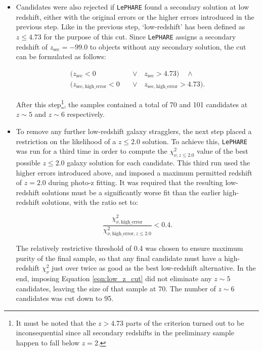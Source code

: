 \begin{itemize}
\item{} Candidates were also rejected if \texttt{LePHARE} found a secondary solution at low redshift, either with the original errors or the higher errors introduced in the previous step. Like in the previous step, `low-redshift' has been defined as $z\leq4.73$ for the purpose of this cut. Since \texttt{LePHARE} assigns a secondary redshift of $z_{\mathrm{sec}}=-99.0$ to objects without any secondary solution, the cut can be formulated as follows: 

\begin{equation}
\begin{alignedat}{1}
    (z_{\mathrm{sec}}< 0 \quad &\lor \quad z_{\mathrm{sec}}>4.73) \quad \land \quad \\ (z_{\mathrm{sec, high\_error}}< 0 \quad &\lor \quad z_{\mathrm{sec, high\_error}}>4.73).\label{eqn:z_sec_cut}
\end{alignedat}
\end{equation} 

\noindent After this step\footnote{It must be noted that the $z>4.73$ parts of the criterion turned out to be inconsequential since all secondary redshifts in the preliminary sample happen to fall below $z=2$.}, the samples contained a total of 70 and 101 candidates at $z\sim5$ and $z\sim6$ respectively. 


\item{} To remove any further low-redshift galaxy stragglers, the next step placed a restriction on the likelihood of a $z\leq 2.0$ solution. To achieve this, \texttt{LePHARE} was run for a third time in order to compute the $\chi^2_{\nu,z\leq2.0}$ value of the best possible $z\leq2.0$ galaxy solution for each candidate. This third run used the higher errors introduced above, and imposed a maximum permitted redshift of $z = 2.0$ during photo-z fitting. It was required that the resulting low-redshift solutions must be a significantly worse fit than the earlier high-redshift solutions, with the ratio set to: 

\begin{equation}
    \frac{\chi^2_{\nu,\mathrm{high\_error}}}{\chi^2_{\nu,\mathrm{high\_error},z\leq 2.0}}< 0.4. \label{eqn:low_z_cut}
\end{equation} 


\noindent The relatively restrictive threshold of 0.4 was chosen to ensure maximum purity of the final sample, so that any final candidate must have a high-redshift $\chi^2_{\nu}$ just over twice as good as the best low-redshift alternative. In the end, imposing Equation \ref{eqn:low_z_cut} did not eliminate any $z\sim5$ candidates, leaving the size of that sample at 70. The number of $z\sim6$ candidates was cut down to 95. 


\end{itemize}
